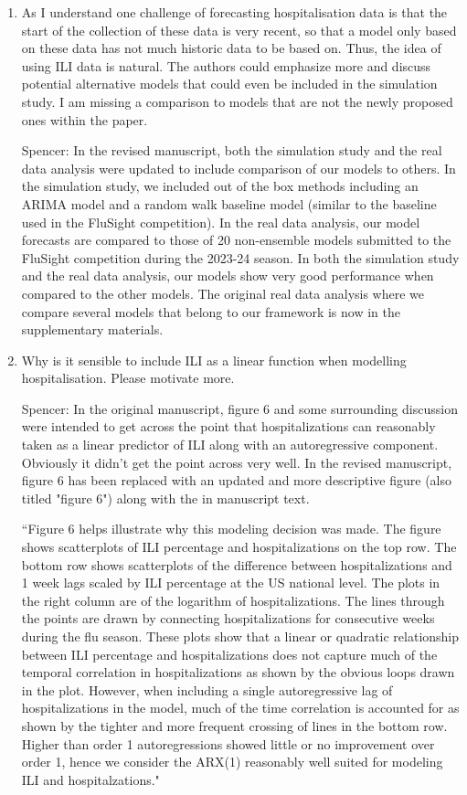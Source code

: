 \documentclass{article}
\newcommand{\spencer}[1]{{\color{blue} Spencer: #1}}
\begin{document}
\begin{enumerate}[1.]
\item As I understand one challenge of forecasting hospitalisation data is that the 
start of the collection of these data is very recent, so that a model only 
based on these data has not much historic data to be based on. Thus, the idea 
of using ILI data is natural. The authors could emphasize more and discuss 
potential alternative models that could even be included in the simulation 
study. I am missing a comparison to models that are not the newly proposed 
ones within the paper.


\spencer{In the revised manuscript, 
both the simulation study and the real data analysis were updated to include
comparison of our models to others. In the simulation study, we included out 
of the box methods including an ARIMA model and a random walk baseline model
(similar to the baseline used in the FluSight competition).
In the real data analysis, our model forecasts are compared to those of 20
non-ensemble models submitted to the FluSight competition during the 2023-24
season. In both the simulation study and the real data analysis, 
our models show very good performance when compared to the other models. 
The original real data analysis where we compare several models that
belong to our framework is now in the supplementary materials.}

\item Why is it sensible to include ILI as a linear function when modelling 
hospitalisation. Please motivate more. 

\spencer{In the original manuscript, figure 6 and some surrounding discussion
were intended to get across the point that hospitalizations can reasonably
taken as a linear predictor of ILI along with an autoregressive component.
Obviously it didn't get the point across very well. 
In the revised manuscript, figure 6 has been replaced with an updated and more
descriptive figure (also titled "figure 6") along with the in manuscript
text.

``Figure 6 helps
illustrate why this modeling decision was made.
The figure shows scatterplots of ILI percentage and 
hospitalizations on the top row.
The bottom row shows scatterplots of the difference between hospitalizations and 
1 week 
lags scaled 
by ILI percentage at the US national level. The plots in the right column
are of the logarithm of hospitalizations. The lines through the points are
drawn by connecting hospitalizations for consecutive weeks during the flu 
season.
These plots show that a linear or quadratic relationship between ILI percentage 
and hospitalizations does not capture much of the temporal correlation in 
hospitalizations as shown by the obvious loops drawn in the plot. 
However, when including a 
single autoregressive lag of hospitalizations in the model, much of the time 
correlation is
accounted for as shown by the tighter and more frequent crossing of lines
in the bottom row. Higher than order 1 autoregressions showed little or no 
improvement over order 1, hence we consider the ARX(1) reasonably well 
suited for modeling ILI and hospitalzations."}


\end{enumerate}
\end{document}

